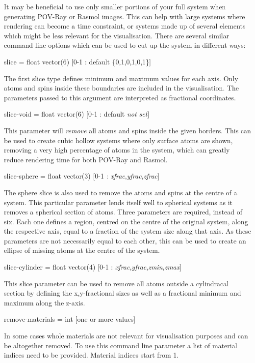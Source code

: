 It may be beneficial to use only smaller portions of your full system when
generating POV-Ray or Rasmol images. This can help with large systems where
rendering can become a time constraint, or systems made up of several elements
which might be less relevant for the visualisation. There are several similar
command line options which can be used to cut up the system in different ways:

{\zicf slice = float vector(6) [0-1 : default \{0,1,0,1,0,1\}]}
 The first slice type
defines minimum and maximum values for each axis. Only atoms and spins inside
these boundaries are included in the visualisation. The parameters passed to
this argument are interpreted as fractional coordinates.

{\zicf slice-void = float vector(6) [0-1 : default \textit{not set}]}
 This parameter will
\textit{remove} all atoms and spins inside the given borders. This can be used
to create cubic hollow systems where only surface atoms are shown,  removing a
very high percentage of atoms in the system, which can greatly reduce rendering
time for both POV-Ray and Rasmol.

{\zicf slice-sphere = float vector(3) [0-1 : \textit{xfrac},\textit{yfrac},\textit{zfrac}]}
 The sphere slice
is also used to remove the atoms and spins at the centre of a system. This
particular parameter lends itself well to spherical systems as it removes a
spherical section of atoms. Three parameters are required, instead of six. Each
one defines a region, centred on the centre of the original system, along the
respective axis, equal to a fraction of the system size along that axis. As
these parameters are not necessarily equal to each other, this can be used to
create an ellipse of missing atoms at the centre of the system.

{\zicf slice-cylinder = float vector(4) [0-1 : \textit{xfrac},\textit{yfrac},\textit{zmin},\textit{zmax}]}
 This slice
parameter can be used to remove all atoms outside a cylindracal section by
defining the x,y-fractional sizes as well as a fractional minimum and maximum
along the z-axis.

{\zicf remove-materials = int [one or more values] }
 In some cases
whole materials are not relevant for visualisation purposes and can be
altogether removed. To use this command line parameter a list of material
indices need to be provided. Material indices start from 1.

